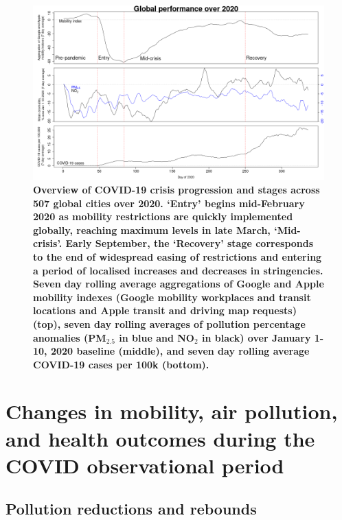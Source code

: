 \documentclass[preprint,10pt]{elsarticle} %
\begin{document}
\begin{figure}
\centering
\includegraphics[trim={0 0 15 20},clip,scale=0.45]{Images/LancetPHOverall.png}
\caption{\bf Overview of COVID-19 crisis progression and stages across 507 global cities over 2020. `Entry' begins mid-February 2020 as mobility restrictions are quickly implemented globally, reaching maximum levels in late March, `Mid-crisis'. Early September, the `Recovery' stage corresponds to the end of widespread easing of restrictions and entering a period of localised increases and decreases in stringencies. Seven day rolling average aggregations of Google and Apple mobility indexes (Google mobility workplaces and transit locations and Apple transit and driving map requests) (top), seven day rolling averages of pollution percentage anomalies (PM$_{2.5}$ in blue and NO$_{2}$ in black) over January 1-10, 2020 baseline (middle), and seven day rolling average COVID-19 cases per 100k (bottom).}
 \label{fig:stages}
\end{figure}

\section*{\textcolor{OliveGreen}{Changes in mobility, air pollution, and health outcomes during the COVID observational period}}
\subsection*{Pollution reductions and rebounds}
\end{document}
